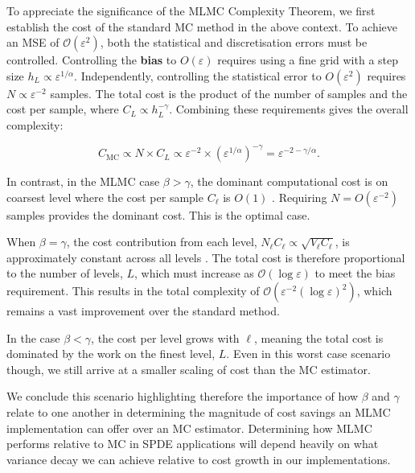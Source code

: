 To appreciate the significance of the MLMC Complexity Theorem, we first establish the cost of the 
standard MC method in the above context. To achieve an MSE of 
$\mathcal{O}(\varepsilon^2)$, both the statistical and discretisation errors must be controlled.
Controlling the \textbf{bias} to $O(\varepsilon)$ requires using a fine grid with a 
step size $h_L \propto \varepsilon^{1/\alpha}$. Independently, controlling the 
statistical error to $O(\varepsilon^2)$ requires 
$N \propto \varepsilon^{-2}$ samples. The total cost is the product of the number of 
samples and the cost per sample, where $C_L \propto h_L^{-\gamma}$. Combining these 
requirements gives the overall complexity:

$$
C_{\mathrm{MC}} \propto N \times C_L \propto \varepsilon^{-2} 
\times (\varepsilon^{1/\alpha})^{-\gamma} = \varepsilon^{-2-\gamma/\alpha}.
$$

In contrast, in the MLMC case $\beta > \gamma$, the dominant computational
cost is on coarsest level where the cost per sample $C_\ell$ is $O(1)$ 
\cite{giles2015multilevel}.
Requiring $N = O(\varepsilon^{-2})$ samples provides the dominant cost. This is the optimal 
case.

When $\beta = \gamma$, the cost contribution from each level, 
$N_\ell C_\ell \propto \sqrt{V_\ell C_\ell}$, is approximately constant across 
all levels \cite{giles2015multilevel}. The total cost is therefore proportional to the 
number of levels, $L$, which must increase as $\mathcal{O}(\log \varepsilon)$ to 
meet the bias requirement. This results in the total complexity of 
$\mathcal{O}(\varepsilon^{-2}(\log \varepsilon)^2)$, which remains a vast 
improvement over the standard method.

In the case $\beta < \gamma$, the cost per level grows with $\ell$, meaning 
the total cost is dominated by the work on the finest level, $L$. 
Even in this worst case scenario though, we still arrive at a smaller scaling of cost 
than the MC estimator. 

We conclude this scenario highlighting therefore the importance of how
$\beta$ and $\gamma$ relate to one another in determining the 
magnitude of cost savings an MLMC implementation can offer over an MC estimator. Determining
how MLMC performs relative to MC in SPDE applications will depend heavily on 
what variance decay we can achieve relative to cost growth in our implementations.





